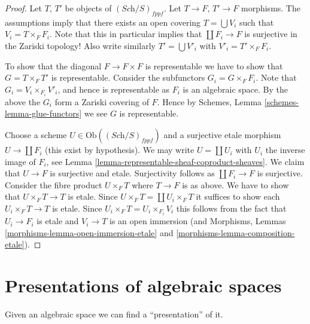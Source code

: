 \begin{proof}
Let $T$, $T'$ be objects of $(\textit{Sch}/S)_{fppf}$.
Let $T \to F$, $T' \to F$ morphisms.
The assumptions imply that there exists an open covering
$T = \bigcup V_i$ such that $V_i = T \times_F F_i$.
Note that this in particular implies that
$\coprod F_i \to F$ is surjective in the Zariski topology!
Also write similarly $T' = \bigcup V'_i$ with $V'_i = T' \times_F F_i$.

\medskip\noindent
To show that the diagonal $F \to F \times F$ is representable
we have to show that $G = T \times_F T'$ is representable.
Consider the subfunctors $G_i = G \times_F F_i$.
Note that $G_i = V_i \times_{F_i} V'_i$, and hence is representable
as $F_i$ is an algebraic space.
By the above the $G_i$ form a Zariski covering of $F$.
Hence by Schemes, Lemma \ref{schemes-lemma-glue-functors}
we see $G$ is representable.

\medskip\noindent
Choose a scheme $U \in \text{Ob}((\textit{Sch}/S)_{fppf})$
and a surjective
etale morphism $U \to \coprod F_i$ (this exist by hypothesis).
We may write $U = \coprod U_i$ with $U_i$ the inverse image of $F_i$,
see Lemma \ref{lemma-representable-sheaf-coproduct-sheaves}.
We claim that $U \to F$ is surjective and
etale. Surjectivity follows as $\coprod F_i \to F$ is surjective.
Consider the fibre product $U \times_F T$ where $T \to F$ is as
above. We have to show that $U \times_F T \to T$ is etale.
Since $U \times_F T = \coprod U_i \times_F T$ it suffices to show
each $U_i \times_F T \to T$ is etale. Since
$U_i \times_F T = U_i \times_{F_i} V_i$ this follows from the
fact that $U_i \to F_i$ is etale and $V_i \to T$ is an open immersion
(and Morphisms, Lemmas \ref{morphisms-lemma-open-immersion-etale}
and \ref{morphisms-lemma-composition-etale}).
\end{proof}














\section{Presentations of algebraic spaces}
\label{section-presentations}

\noindent
Given an algebraic space we can find a ``presentation'' of it.


